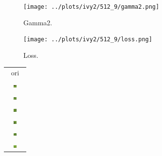 \documentclass[letter]{article}
\begin{document}
\begin{figure}[h!]
	\centering
	\texttt{[image: ../plots/ivy2/512\_9/gamma2.png]}
	\caption{\label{fig:gamma1}Gamma2.}
\end{figure}

\begin{figure}[h!]
	\centering
	\texttt{[image: ../plots/ivy2/512\_9/loss.png]}
	\caption{\label{fig:gamma1}Loss.}
\end{figure}

\newpage

\begin{table}[h!]
	\centering
	\begin{tabular}{c}
		ori\tabularnewline
		\includegraphics[width=0.17\textwidth]{../data/ivy2/512/1} \tabularnewline		\includegraphics[width=0.17\textwidth]{../data/ivy2/512/2} \tabularnewline		\includegraphics[width=0.17\textwidth]{../data/ivy2/512/3} \tabularnewline		\includegraphics[width=0.17\textwidth]{../data/ivy2/512/4} \tabularnewline		\includegraphics[width=0.17\textwidth]{../data/ivy2/512/5} \tabularnewline		\includegraphics[width=0.17\textwidth]{../data/ivy2/512/6} \tabularnewline

\end{tabular}
\end{table}
\end{document}
